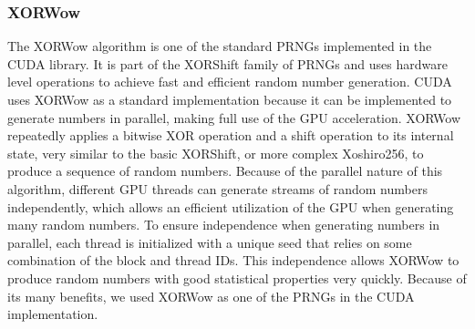 \documentclass{article}
\begin{document}
            \subsubsection{XORWow}
The XORWow algorithm is one of the standard PRNGs implemented in the CUDA library. It is part of the XORShift family of PRNGs and uses hardware level operations to achieve fast and efficient random number generation. CUDA uses XORWow as a standard implementation because it can be implemented to generate numbers in parallel, making full use of the GPU acceleration. XORWow repeatedly applies a bitwise XOR operation and a shift operation to its internal state, very similar to the basic XORShift, or more complex Xoshiro256, to produce a sequence of random numbers. Because of the parallel nature of this algorithm, different GPU threads can generate streams of random numbers independently, which allows an efficient utilization of the GPU when generating many random numbers. To ensure independence when generating numbers in parallel, each thread is initialized with a unique seed that relies on some combination of the block and thread IDs. This independence allows XORWow to produce random numbers with good statistical properties very quickly. Because of its many benefits, we used XORWow as one of the PRNGs in the CUDA implementation.
\end{document}
